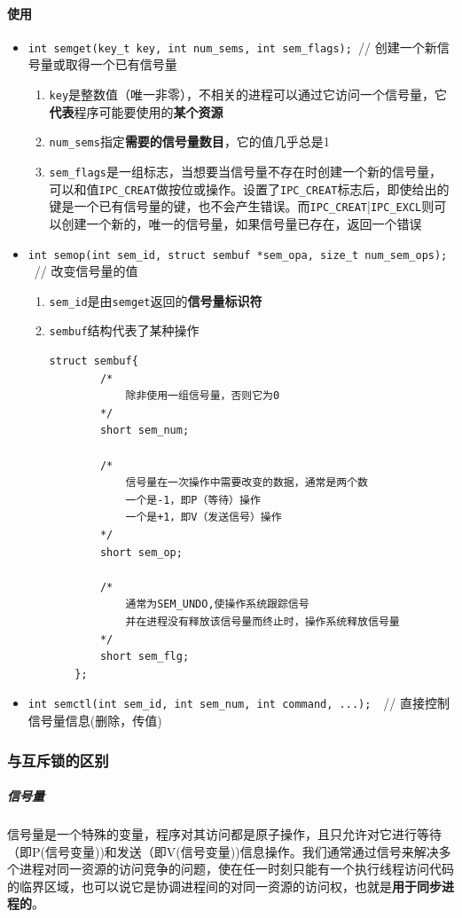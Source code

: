 \documentclass[UTF8,a4paper,12pt]{ctexbook}
\begin{document}
				\paragraph{使用}
					\begin{itemize}
						\item \verb|int semget(key_t key, int num_sems, int sem_flags); |// 创建一个新信号量或取得一个已有信号量
							\begin{enumerate}
								\item \verb|key|是整数值（唯一非零），不相关的进程可以通过它访问一个信号量，它\textbf{代表}程序可能要使用的\textbf{某个资源}
								\item \verb|num_sems|指定\textbf{需要的信号量数目}，它的值几乎总是1
								\item \verb|sem_flags|是一组标志，当想要当信号量不存在时创建一个新的信号量，可以和值\verb|IPC_CREAT|做按位或操作。设置了\verb|IPC_CREAT|标志后，即使给出的键是一个已有信号量的键，也不会产生错误。而\verb|IPC_CREAT||\verb|IPC_EXCL|则可以创建一个新的，唯一的信号量，如果信号量已存在，返回一个错误
							\end{enumerate}
						\item \verb|int semop(int sem_id, struct sembuf *sem_opa, size_t num_sem_ops);|  // 改变信号量的值
							\begin{enumerate}
								\item \verb|sem_id|是由\verb|semget|返回的\textbf{信号量标识符}
								\item \verb|sembuf|结构代表了某种操作
									\begin{lstlisting}[frame=L,xleftmargin=.05\textwidth]
	struct sembuf{  
		/*
			除非使用一组信号量，否则它为0 
		*/
		short sem_num; 
		
		/*
			信号量在一次操作中需要改变的数据，通常是两个数
			一个是-1，即P（等待）操作
			一个是+1，即V（发送信号）操作
		*/
		short sem_op;
		
		/*
			通常为SEM_UNDO,使操作系统跟踪信号
			并在进程没有释放该信号量而终止时，操作系统释放信号量
		*/ 
		short sem_flg;
	};  
									\end{lstlisting}
							\end{enumerate}
						\item \verb|int semctl(int sem_id, int sem_num, int command, ...);|  // 直接控制信号量信息(删除，传值)
					\end{itemize}
			
			\subsubsection{与互斥锁的区别}
				\subparagraph{信号量}
					信号量是一个特殊的变量，程序对其访问都是原子操作，且只允许对它进行等待（即P(信号变量))和发送（即V(信号变量))信息操作。我们通常通过信号来解决多个进程对同一资源的访问竞争的问题，使在任一时刻只能有一个执行线程访问代码的临界区域，也可以说它是协调进程间的对同一资源的访问权，也就是\textbf{用于同步进程的}。
			
\end{document}
